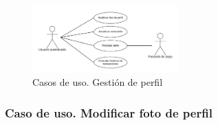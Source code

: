 \begin{figure}[H]
    \centering
    \includegraphics[width=0.5\textwidth]{figures/6-Analisis/6-Casos-uso/6_3_2_Gestion-perfil.png}
    \caption{Casos de uso. Gestión de perfil}
    \label{fig:cu_gestion-perfil}
\end{figure}
\subsubsection{Caso de uso. Modificar foto de perfil} \label{sec:cu_modificar-perfil}
